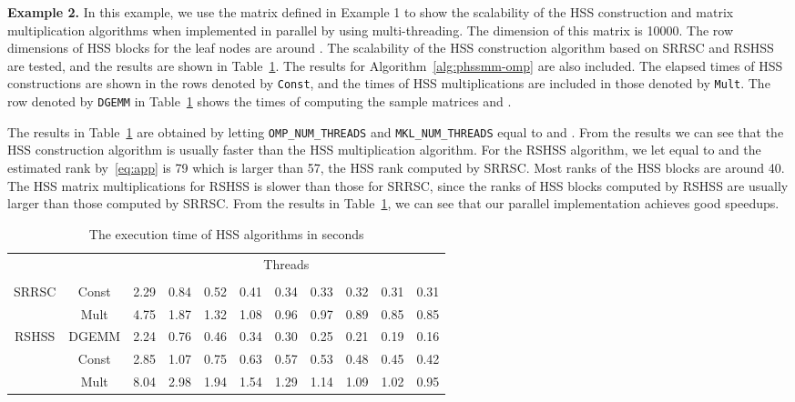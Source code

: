 \documentclass[times]{nlaauth}
\newcounter{algorithm}
\begin{document}
{\bf Example 2.} In this example, we use the matrix defined in Example 1 to show the
scalability of the HSS construction and matrix multiplication algorithms when implemented in parallel by using multi-threading.
The dimension of this matrix is 10000.
The row dimensions of HSS blocks for the leaf nodes are around . The scalability of the HSS construction algorithm based on SRRSC and RSHSS are tested,
and the results are shown in Table~\ref{tab:Ex1-speedups}.
The results for Algorithm~\ref{alg:phssmm-omp} are also included.
The elapsed times of HSS constructions are shown in the rows denoted by \texttt{Const}, and
the times of HSS multiplications are included in those denoted by \texttt{Mult}.
The row denoted by \texttt{DGEMM} in Table~\ref{tab:Ex1-speedups} shows the times of computing the
sample matrices  and .

The results in Table~\ref{tab:Ex1-speedups} are obtained by letting \texttt{OMP\_NUM\_THREADS} and \texttt{MKL\_NUM\_THREADS}
equal to  and .
From the results we can see that the HSS construction algorithm is usually faster than the HSS multiplication algorithm.
For the RSHSS algorithm, we let  equal to  and the estimated rank by~\eqref{eq:app} is 79 which is
larger than 57, the HSS rank computed by SRRSC.
Most ranks of the HSS blocks are around 40.
The HSS matrix multiplications for RSHSS is slower than those for SRRSC,
since the ranks of HSS blocks computed by RSHSS are usually larger than those computed by SRRSC.
From the results in Table~\ref{tab:Ex1-speedups}, we can see that our parallel implementation
achieves good speedups.

\begin{table}[ptbh]
\caption{The execution time of HSS algorithms in seconds}\label{tab:Ex1-speedups}
\begin{center}\begin{tabular}
[c]{|c|c|c|c|c|c|c|c|c|c|c|}\hline
\multicolumn{2}{|c|}{ \multirow{2}{*}{Method} } & \multicolumn{9}{c|}{Threads}  \\ \cline{3-11}
\multicolumn{2}{|c|}{}         &    &   &   &   &   &  &  &  &   \\ \hline \hline
\multirow{2}{*}{SRRSC} & Const &  2.29 & 0.84 & 0.52 & 0.41 & 0.34 & 0.33 & 0.32 & 0.31 & 0.31   \\ \cline{2-11}
                       & Mult  &  4.75 & 1.87 & 1.32 & 1.08 & 0.96 & 0.97 & 0.89  & 0.85 & 0.85   \\ \hline \hline
\multirow{3}{*}{RSHSS} & DGEMM &  2.24 & 0.76 & 0.46 & 0.34 & 0.30 & 0.25 & 0.21 & 0.19 & 0.16  \\ \cline{2-11}
                       & Const &  2.85 & 1.07 & 0.75 & 0.63 & 0.57 & 0.53 & 0.48 & 0.45 & 0.42  \\ \cline{2-11}
                       & Mult &  8.04 & 2.98  & 1.94 & 1.54 & 1.29 & 1.14 & 1.09 & 1.02 & 0.95  \\ \hline
\end{tabular}
\end{center}
\end{table}
\end{document}
